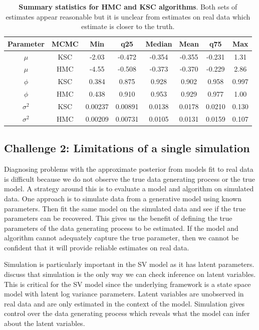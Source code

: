 \documentclass[12pt, a4paper]{article}
\begin{document}
    \begin{table}[H]
        \centering
        \begin{tabular}{|c|c|c|c|c|c|c|c|} \hline 
        Parameter&  MCMC&Min& q25&  Median& Mean & q75&Max\\ \hline 
        $\mu$&  KSC&-2.03 & -0.472 & -0.354 & -0.355 & -0.231 & 1.31 \\
     $\mu$&  HMC&-4.55 & -0.508 & -0.373 & -0.370 & -0.229 &2.86  \\\hline 
     $\phi$&  KSC&0.384 & 0.875 & 0.928 & 0.902 & 0.958 & 0.997 \\
     $\phi$&  HMC&0.438 & 0.910 & 0.953 & 0.929 & 0.977 &1.00  \\ \hline 
     $\sigma^2$&  KSC&0.00237 & 0.00891 & 0.0138 & 0.0178 & 0.0210 & 0.130 \\ 
     $\sigma^2$&  HMC&0.00209 & 0.00731 & 0.0105 & 0.0131 & 0.0159 &0.107 \\ \hline
        \end{tabular}
        \caption{\textbf{Summary statistics for HMC and KSC algorithms}. Both sets of estimates appear reasonable but it is unclear from estimates on real data which estimate is closer to the truth.}
        \label{tab:realdata}
    \end{table}
    
\subsection{Challenge 2: Limitations of a single simulation}
    Diagnosing problems with the approximate posterior from models fit to real data is difficult because we do not observe the true data generating process or the true model. A strategy around this is to evaluate a model and algorithm on simulated data. One approach is to simulate data from a generative model using known parameters. Then fit the same model on the simulated data and see if the true parameters can be recovered. This gives us the benefit of defining the true parameters of the data generating process to be estimated. If the model and algorithm cannot adequately capture the true parameter, then we cannot be confident that it will provide reliable estimates on real data.

    Simulation is particularly important in the SV model as it has latent parameters. \citet{gelman2020bayesian} discuss that simulation is the only way we can check inference on latent variables. This is critical for the SV model since the underlying framework is a state space model with latent log variance parameters. Latent variables are unobserved in real data and are only estimated in the context of the model. Simulation gives control over the data generating process which reveals what the model can infer about the latent variables. 
\end{document}
